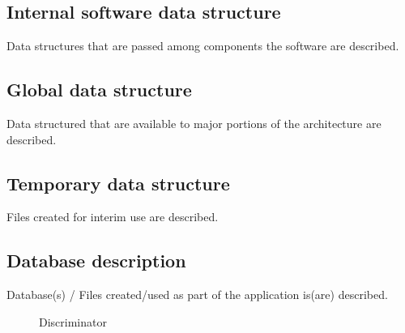 \documentclass[oneside,a4paper,12pt]{report}
\begin{document}
\begin{table}[!htbp]
\subsection{Internal software data structure}
Data structures that are passed among components the software are described.
\subsection{Global data structure}
Data structured that are available to major portions of the architecture are described.
\subsection{Temporary data structure}
Files created for interim use are described.
\subsection{Database description}
Database(s) / Files created/used  as part of the application is(are) described.

  \begin{center}
	\begin{figure}[!htbp]
		\centering
	  \caption{Discriminator}
	  \label{fig:disc_color-dig}
	\end{figure}
  \end{center}


\end{table}
\end{document}
